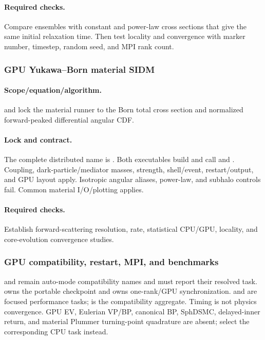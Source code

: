 \paragraph{Required checks.}
Compare ensembles with constant and power-law cross sections that give the
same initial relaxation time. Then test locality and convergence with marker
number, timestep, random seed, and MPI rank count.

\subsubsection{GPU Yukawa--Born material SIDM}
\paragraph{Scope/equation/algorithm.}
 and  lock the material runner to
the Born total cross section and normalized forward-peaked differential
angular CDF.
\paragraph{Lock and contract.}
The complete distributed name is .  Both
executables build  and call
 and
.
Coupling, dark-particle/mediator masses, strength, shell/event, restart/output,
and GPU layout apply.  Isotropic angular aliases, power-law, and subhalo
controls fail.  Common material I/O/plotting applies.
\paragraph{Required checks.}
Establish forward-scattering resolution, rate, statistical CPU/GPU, locality,
and core-evolution convergence studies.

\subsubsection{GPU compatibility, restart, MPI, and benchmarks}
 and  remain auto-mode compatibility
names and must report their resolved task.   owns the
portable checkpoint and  owns one-rank/GPU
synchronization.   and
 are focused performance tasks;
 is the compatibility aggregate.  Timing is not physics
convergence.  GPU EV, Eulerian VP/BP, canonical BP, SphDSMC, delayed-inner
return, and material Plummer turning-point quadrature are absent; select the
corresponding CPU task instead.
